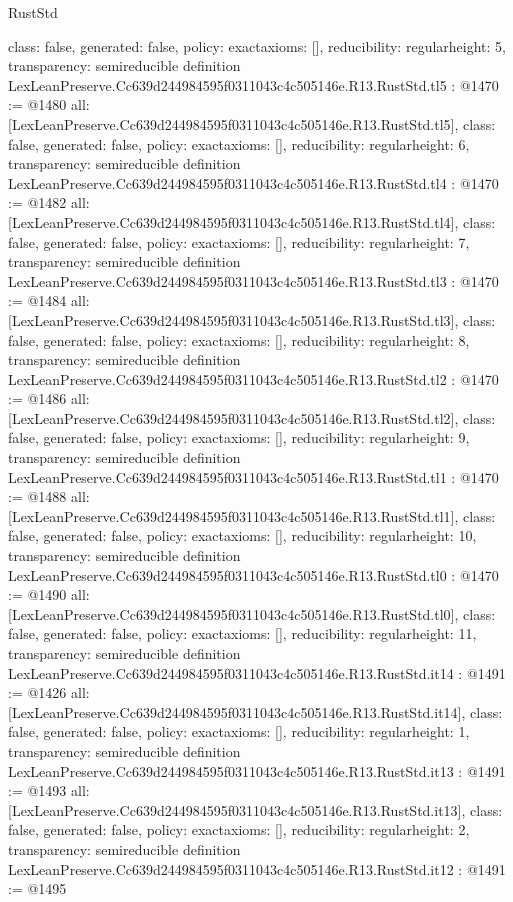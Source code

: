 \begin{lexlean}{RustStd}
\begin{coremodule}
{  class: false,
  generated: false,
  policy: exact{axioms: []},
  reducibility: regular{height: 5},
  transparency: semireducible
}
definition LexLeanPreserve.Cc639d244984595f0311043c4c505146e.R13.RustStd.tl5 : @1470 := @1480 {
  all: [LexLeanPreserve.Cc639d244984595f0311043c4c505146e.R13.RustStd.tl5],
  class: false,
  generated: false,
  policy: exact{axioms: []},
  reducibility: regular{height: 6},
  transparency: semireducible
}
definition LexLeanPreserve.Cc639d244984595f0311043c4c505146e.R13.RustStd.tl4 : @1470 := @1482 {
  all: [LexLeanPreserve.Cc639d244984595f0311043c4c505146e.R13.RustStd.tl4],
  class: false,
  generated: false,
  policy: exact{axioms: []},
  reducibility: regular{height: 7},
  transparency: semireducible
}
definition LexLeanPreserve.Cc639d244984595f0311043c4c505146e.R13.RustStd.tl3 : @1470 := @1484 {
  all: [LexLeanPreserve.Cc639d244984595f0311043c4c505146e.R13.RustStd.tl3],
  class: false,
  generated: false,
  policy: exact{axioms: []},
  reducibility: regular{height: 8},
  transparency: semireducible
}
definition LexLeanPreserve.Cc639d244984595f0311043c4c505146e.R13.RustStd.tl2 : @1470 := @1486 {
  all: [LexLeanPreserve.Cc639d244984595f0311043c4c505146e.R13.RustStd.tl2],
  class: false,
  generated: false,
  policy: exact{axioms: []},
  reducibility: regular{height: 9},
  transparency: semireducible
}
definition LexLeanPreserve.Cc639d244984595f0311043c4c505146e.R13.RustStd.tl1 : @1470 := @1488 {
  all: [LexLeanPreserve.Cc639d244984595f0311043c4c505146e.R13.RustStd.tl1],
  class: false,
  generated: false,
  policy: exact{axioms: []},
  reducibility: regular{height: 10},
  transparency: semireducible
}
definition LexLeanPreserve.Cc639d244984595f0311043c4c505146e.R13.RustStd.tl0 : @1470 := @1490 {
  all: [LexLeanPreserve.Cc639d244984595f0311043c4c505146e.R13.RustStd.tl0],
  class: false,
  generated: false,
  policy: exact{axioms: []},
  reducibility: regular{height: 11},
  transparency: semireducible
}
definition LexLeanPreserve.Cc639d244984595f0311043c4c505146e.R13.RustStd.it14 : @1491 := @1426 {
  all: [LexLeanPreserve.Cc639d244984595f0311043c4c505146e.R13.RustStd.it14],
  class: false,
  generated: false,
  policy: exact{axioms: []},
  reducibility: regular{height: 1},
  transparency: semireducible
}
definition LexLeanPreserve.Cc639d244984595f0311043c4c505146e.R13.RustStd.it13 : @1491 := @1493 {
  all: [LexLeanPreserve.Cc639d244984595f0311043c4c505146e.R13.RustStd.it13],
  class: false,
  generated: false,
  policy: exact{axioms: []},
  reducibility: regular{height: 2},
  transparency: semireducible
}
definition LexLeanPreserve.Cc639d244984595f0311043c4c505146e.R13.RustStd.it12 : @1491 := @1495 {
}
\end{coremodule}
\end{lexlean}
